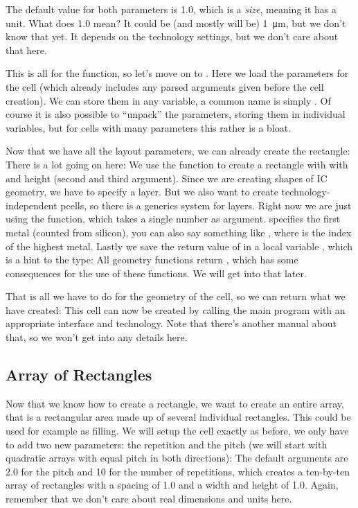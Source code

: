 The default value for both parameters is 1.0, which is a \emph{size}, meaning it has a unit. What does 1.0 mean? It could be (and mostly will be)
\SI{1}{\micro\meter}, but we don't know that yet. It depends on the technology settings, but we don't care about that here.

This is all for the  function, so let's move on to . Here we load the parameters for the cell (which already includes any
parsed arguments given before the cell creation). We can store them in any variable, a common name is simply . Of course it is also possible to
\enquote{unpack} the parameters, storing them in individual variables, but for cells with many parameters this rather is a bloat.

Now that we have all the layout parameters, we can already create the rectangle:
There is a lot going on here: We use the  function to create a rectangle with with and height (second and third argument). Since we are
creating shapes of IC geometry, we have to specify a layer. But we also want to create technology-independent pcells, so there is a generics system for layers. Right
now we are just using the  function, which takes a single number as argument.  specifies the first metal
(counted from silicon), you can also say something like , where  is the index of the highest metal. Lastly we save the return value
of  in a local variable , which is a hint to the type: All geometry functions return , which has some
consequences for the use of these functions. We will get into that later.

That is all we have to do for the geometry of the cell, so we can return what we have created:
This cell can now be created by calling the main program with an appropriate interface and technology. Note that there's another manual about that, so we won't get
into any details here.

\subsection{Array of Rectangles}
Now that we know how to create a rectangle, we want to create an entire array, that is a rectangular area made up of several individual rectangles. This could be
used for example as filling. We will setup the cell exactly as before, we only have to add two new parameters: the repetition and the pitch (we will start with
quadratic arrays with equal pitch in both directions):
The default arguments are \num{2.0} for the pitch and \num{10} for the number of repetitions, which creates a ten-by-ten array of rectangles with a spacing of
\num{1.0} and a width and height of \num{1.0}. Again, remember that we don't care about real dimensions and units here.

